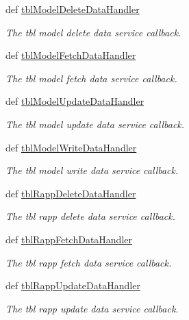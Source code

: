 \begin{DoxyCompactItemize}
def \hyperlink{classmysql__wrapper_1_1MySQLdbWrapper_a7e8d48bb87a448d86a353fe2210d5ea5}{tbl\-Model\-Delete\-Data\-Handler}
\begin{DoxyCompactList}\small\item\em The tbl model delete data service callback. \end{DoxyCompactList}\item 
def \hyperlink{classmysql__wrapper_1_1MySQLdbWrapper_a626c097d8ef96d5f780c25cff7a62c61}{tbl\-Model\-Fetch\-Data\-Handler}
\begin{DoxyCompactList}\small\item\em The tbl model fetch data service callback. \end{DoxyCompactList}\item 
def \hyperlink{classmysql__wrapper_1_1MySQLdbWrapper_aefb5305d417b2670873c3562bb262593}{tbl\-Model\-Update\-Data\-Handler}
\begin{DoxyCompactList}\small\item\em The tbl model update data service callback. \end{DoxyCompactList}\item 
def \hyperlink{classmysql__wrapper_1_1MySQLdbWrapper_ae18bcfbd6052ab7110161d076377ee17}{tbl\-Model\-Write\-Data\-Handler}
\begin{DoxyCompactList}\small\item\em The tbl model write data service callback. \end{DoxyCompactList}\item 
def \hyperlink{classmysql__wrapper_1_1MySQLdbWrapper_ad139cfcc6f98628192c37560ed9852c3}{tbl\-Rapp\-Delete\-Data\-Handler}
\begin{DoxyCompactList}\small\item\em The tbl rapp delete data service callback. \end{DoxyCompactList}\item 
def \hyperlink{classmysql__wrapper_1_1MySQLdbWrapper_a02fc85518a3d25ddeffb20b0921fcf6e}{tbl\-Rapp\-Fetch\-Data\-Handler}
\begin{DoxyCompactList}\small\item\em The tbl rapp fetch data service callback. \end{DoxyCompactList}\item 
def \hyperlink{classmysql__wrapper_1_1MySQLdbWrapper_a70831d613b47d81b959624ecfa58855c}{tbl\-Rapp\-Update\-Data\-Handler}
\begin{DoxyCompactList}\small\item\em The tbl rapp update data service callback. \end{DoxyCompactList}\item 

\end{DoxyCompactItemize}
